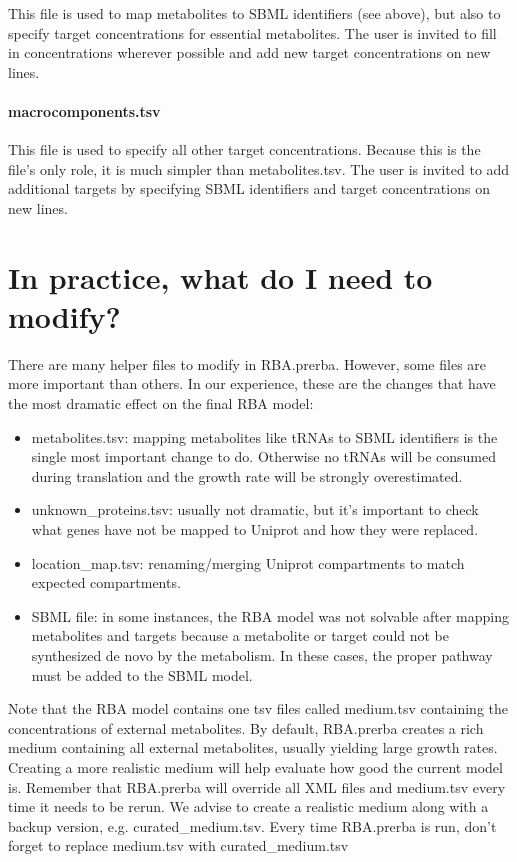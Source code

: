 This file is used to map metabolites to SBML identifiers (see above),
but also to specify target concentrations for essential metabolites.
The user is invited to fill in concentrations wherever possible and
add new target concentrations on new lines.

\paragraph{macrocomponents.tsv}

This file is used to specify all other target concentrations.
Because this is the file's only role, it is much simpler than metabolites.tsv.
The user is invited to add additional targets by specifying SBML identifiers
and target concentrations on new lines.

\section{In practice, what do I need to modify?}

There are many helper files to modify in RBA.prerba.
However, some files are more important than others.
In our experience, these are the changes that have the most dramatic effect
on the final RBA model:
\begin{itemize}
  \item metabolites.tsv: mapping metabolites like tRNAs to SBML identifiers is the single most
  important change to do.
  Otherwise no tRNAs will be consumed during translation
  and the growth rate will be strongly overestimated.
  \item unknown\_proteins.tsv: usually not dramatic, but it's important to
  check what genes have not be mapped to Uniprot and how they were replaced.
  \item location\_map.tsv: renaming/merging Uniprot compartments to match expected
  compartments.
  \item SBML file: in some instances, the RBA model was not solvable after
  mapping metabolites and targets because a metabolite or target could not
  be synthesized de novo by the metabolism.
  In these cases, the proper pathway must be added to the SBML model.
\end{itemize}

Note that the RBA model contains one tsv files called medium.tsv
containing the concentrations of external metabolites.
By default, RBA.prerba creates a rich medium containing all external metabolites,
usually yielding large growth rates.
Creating a more realistic medium will help evaluate how good the current model is.
Remember that RBA.prerba will override all XML files and medium.tsv every time it
needs to be rerun.
We advise to create a realistic medium along with a backup version, e.g. curated\_medium.tsv.
Every time RBA.prerba is run, don't forget to replace medium.tsv with curated\_medium.tsv
